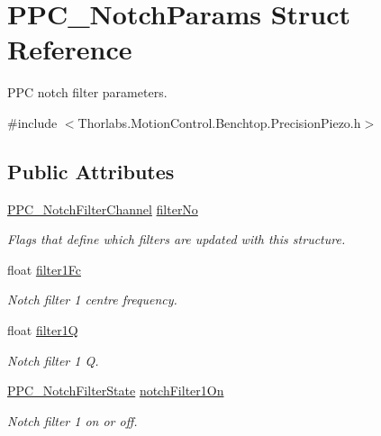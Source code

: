 \hypertarget{struct_p_p_c___notch_params}{}\section{P\+P\+C\+\_\+\+Notch\+Params Struct Reference}
\label{struct_p_p_c___notch_params}


P\+PC notch filter parameters.  




{\ttfamily \#include $<$Thorlabs.\+Motion\+Control.\+Benchtop.\+Precision\+Piezo.\+h$>$}

\subsection*{Public Attributes}
\begin{DoxyCompactItemize}
\item 
\hyperlink{group___benchtop_precision_piezo_ga5cf04a851dbce8255243635d6364a1a0}{P\+P\+C\+\_\+\+Notch\+Filter\+Channel} \hyperlink{struct_p_p_c___notch_params_aeb5edfe4968a29273f6af55b8b4ed669}{filter\+No}
\begin{DoxyCompactList}\small\item\em Flags that define which filters are updated with this structure. \end{DoxyCompactList}\item 
float \hyperlink{struct_p_p_c___notch_params_abcb5b7fdcd6c42059445447f177c4733}{filter1\+Fc}
\begin{DoxyCompactList}\small\item\em Notch filter 1 centre frequency. \end{DoxyCompactList}\item 
float \hyperlink{struct_p_p_c___notch_params_a0417d4278c90c62376b4febb0a9b40ed}{filter1Q}
\begin{DoxyCompactList}\small\item\em Notch filter 1 Q. \end{DoxyCompactList}\item 
\hyperlink{group___benchtop_precision_piezo_ga03b89881d4e9a76087bbe1d517dd62b0}{P\+P\+C\+\_\+\+Notch\+Filter\+State} \hyperlink{struct_p_p_c___notch_params_a5f3d080db2c5af2d543e39fc33f1220d}{notch\+Filter1\+On}
\begin{DoxyCompactList}\small\item\em Notch filter 1 on or off. \end{DoxyCompactList}\item 

\end{DoxyCompactItemize}
